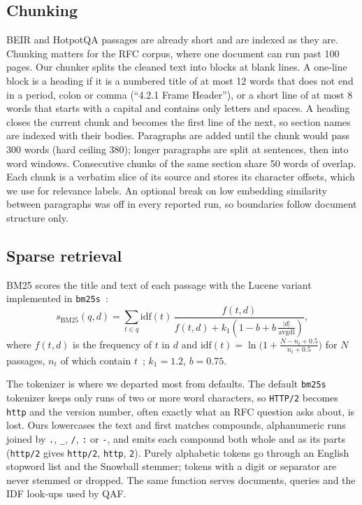 \subsection{Chunking}
\label{sec:chunking}
BEIR and HotpotQA passages are already short and are indexed as they are.
Chunking matters for the RFC corpus, where one document can run past 100
pages. Our chunker splits the cleaned text into blocks at blank lines. A
one-line block is a heading if it is a numbered title of at most 12 words that
does not end in a period, colon or comma (``4.2.1 Frame Header''), or a short
line of at most 8 words that starts with a capital and contains only letters
and spaces. A heading closes the current chunk and becomes the first line of
the next, so section names are indexed with their bodies. Paragraphs are added
until the chunk would pass 300 words (hard ceiling 380); longer paragraphs are
split at sentences, then into word windows. Consecutive chunks of the same
section share 50 words of overlap. Each chunk is a verbatim slice of its source
and stores its character offsets, which we use for relevance labels. An
optional break on low embedding similarity between paragraphs was off in every
reported run, so boundaries follow document structure only.

\subsection{Sparse retrieval}
BM25 scores the title and text of each passage with the Lucene variant
implemented in \texttt{bm25s}~\cite{lu2024bm25s}:
\begin{equation}
  s_{\mathrm{BM25}}(q,d)=\sum_{t\in q}\mathrm{idf}(t)\,
  \frac{f(t,d)}{f(t,d)+k_1\!\left(1-b+b\,\frac{|d|}{\mathrm{avgdl}}\right)},
  \label{eq:bm25}
\end{equation}
where $f(t,d)$ is the frequency of $t$ in $d$ and
$\mathrm{idf}(t)=\ln\bigl(1+\frac{N-n_t+0.5}{n_t+0.5}\bigr)$ for $N$ passages,
$n_t$ of which contain $t$~\cite{robertson2009bm25}; $k_1=1.2$, $b=0.75$.

The tokenizer is where we departed most from defaults. The default
\texttt{bm25s} tokenizer keeps only runs of two or more word characters, so
\texttt{HTTP/2} becomes \texttt{http} and the version number, often exactly
what an RFC question asks about, is lost. Ours lowercases the text and
first matches compounds, alphanumeric runs joined by \texttt{.}, \texttt{\_},
\texttt{/}, \texttt{:} or \texttt{-}, and emits each compound both whole and as
its parts (\texttt{http/2} gives \texttt{http/2}, \texttt{http}, \texttt{2}).
Purely alphabetic tokens go through an English stopword list and the Snowball
stemmer; tokens with a digit or separator are never stemmed or dropped. The
same function serves documents, queries and the IDF look-ups used by QAF.

